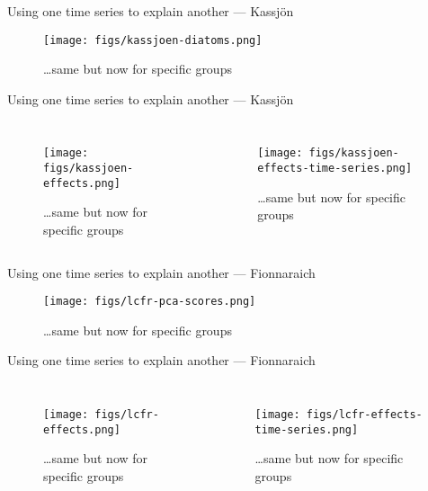 \documentclass[11pt,ignorenonframetext,compress, aspectratio=169]{beamer}
\newcommand{\columnsbegin}{\begin{columns}}
\newcommand{\columnsend}{\end{columns}}
\begin{document}
\begin{frame}{Using one time series to explain another --- Kassjön}

\begin{figure}[htbp]
\centering
\texttt{[image: figs/kassjoen-diatoms.png]}
\caption{\ldots{}same but now for specific groups}
\end{figure}

\end{frame}

\begin{frame}{Using one time series to explain another --- Kassjön}

\columnsbegin
{}

\begin{figure}[htbp]
\centering
\texttt{[image: figs/kassjoen-effects.png]}
\caption{\ldots{}same but now for specific groups}
\end{figure}


\begin{figure}[htbp]
\centering
\texttt{[image: figs/kassjoen-effects-time-series.png]}
\caption{\ldots{}same but now for specific groups}
\end{figure}

\columnsend

\end{frame}

\begin{frame}{Using one time series to explain another --- Fionnaraich}

\begin{figure}[htbp]
\centering
\texttt{[image: figs/lcfr-pca-scores.png]}
\caption{\ldots{}same but now for specific groups}
\end{figure}

\end{frame}

\begin{frame}{Using one time series to explain another --- Fionnaraich}

\columnsbegin
{}

\begin{figure}[htbp]
\centering
\texttt{[image: figs/lcfr-effects.png]}
\caption{\ldots{}same but now for specific groups}
\end{figure}


\begin{figure}[htbp]
\centering
\texttt{[image: figs/lcfr-effects-time-series.png]}
\caption{\ldots{}same but now for specific groups}
\end{figure}

\columnsend

\end{frame}
\end{document}
